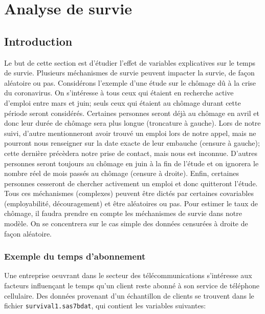 \documentclass[
  11pt,
  letterpaper,
]{book}
\theoremstyle{definition}
\theoremstyle{definition}
\theoremstyle{definition}
\theoremstyle{remark}
\begin{document}
\hypertarget{analyse-survie}{%
\chapter{Analyse de survie}\label{analyse-survie}}

\hypertarget{introduction-5}{%
\section{Introduction}\label{introduction-5}}

Le but de cette section est d'étudier l'effet de variables explicatives sur le temps de survie. Plusieurs méchanismes de survie peuvent impacter la survie, de façon aléatoire ou pas.
Considérons l'exemple d'une étude sur le chômage dû à la crise du coronavirus. On s'intéresse à tous ceux qui étaient en recherche active d'emploi entre mars et juin; seuls ceux qui étaient au chômage durant cette période seront considérés. Certaines personnes seront déjà au chômage en avril et donc leur durée de chômage sera plus longue (troncature à gauche). Lors de notre suivi, d'autre mentionneront avoir trouvé un emploi lors de notre appel, mais ne pourront nous renseigner sur la date exacte de leur embauche (censure à gauche); cette dernière précèdera notre prise de contact, mais nous est inconnue. D'autres personnes seront toujours au chômage en juin à la fin de l'étude et on ignorera le nombre réel de mois passés au chômage (censure à droite). Enfin, certaines personnes cesseront de chercher activement un emploi et donc quitteront l'étude. Tous ces méchanismes (complexes) peuvent être dictés par certaines covariables (employabilité, découragement) et être aléatoires ou pas. Pour estimer le taux de chômage, il faudra prendre en compte les méchanismes de survie dans notre modèle. On se concentrera sur le cas simple des données censurées à droite de façon aléatoire.

\hypertarget{exemple-du-temps-dabonnement}{%
\subsection{Exemple du temps d'abonnement}\label{exemple-du-temps-dabonnement}}

Une entreprise oeuvrant dans le secteur des télécommunications s'intéresse aux facteurs influençant le temps qu'un client reste abonné à son service de téléphone cellulaire. Des données provenant d'un échantillon de clients se trouvent dans le fichier \texttt{survival1.sas7bdat}, qui contient les variables suivantes:
\end{document}
